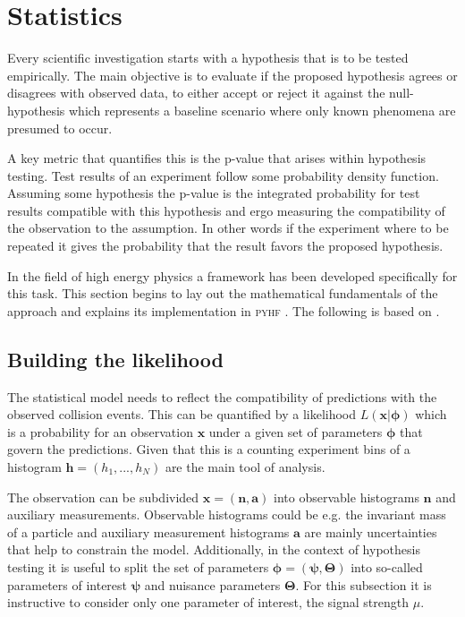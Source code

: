 \chapter{Statistics}\label{sec:statistics}

Every scientific investigation starts with a hypothesis that is to be tested empirically. The main objective is to evaluate if the proposed hypothesis agrees or disagrees with observed data, to either accept or reject it against the null-hypothesis which represents a baseline scenario where only known phenomena are presumed to occur. 

A key metric that quantifies this is the p-value that arises within hypothesis testing. Test results of an experiment follow some probability density function. Assuming some hypothesis the p-value is the integrated probability for test results compatible with this hypothesis and ergo measuring the compatibility of the observation to the assumption. In other words if the experiment where to be repeated it gives the probability that the result favors the proposed hypothesis.

In the field of high energy physics a framework has been developed specifically for this task. This section begins to lay out the mathematical fundamentals of the approach and explains its implementation in \textsc{pyhf} \citep{pyhf,pyhf_joss}. The following is based on \citep{cowan2011asymptotic,behnke2013data,pyhf}.
 
\section{Building the likelihood}\label{sec:likelihood}
The statistical model needs to reflect the compatibility of predictions with the observed collision events. This can be quantified by a likelihood $L(\bm{x} | \bm{\phi})$ which is a probability for an observation $\bm{x}$ under a given set of parameters $\bm{\phi}$ that govern the predictions. Given that this is a counting experiment bins of a histogram $\bm{h}=(h_1,...,h_N)$ are the main tool of analysis.

The observation can be subdivided $\bm{x}=(\bm{n},\bm{a})$ into observable histograms $\bm{n}$ and auxiliary measurements. Observable histograms could be e.g. the invariant mass of a particle and auxiliary measurement histograms $\bm{a}$ are mainly uncertainties that help to constrain the model. Additionally, in the context of hypothesis testing it is useful to split the set of parameters $\bm{\phi}=(\bm{\psi},\bm{\Theta})$ into so-called parameters of interest $\bm{\psi}$ and nuisance parameters $\bm{\Theta}$. For this subsection it is instructive to consider only one parameter of interest, the signal strength $\mu$. 

